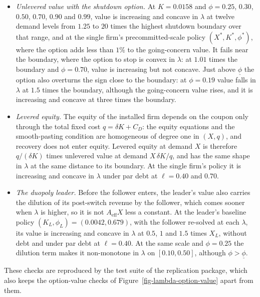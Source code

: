 \documentclass[
  11pt,
  letterpaper,
]{scrartcl}
\providecommand{\tightlist}{%
  \setlength{\itemsep}{0pt}\setlength{\parskip}{0pt}}
\begin{document}
\begin{itemize}
\tightlist
\item
  \emph{Unlevered value with the shutdown option.} At \(K = 0.0158\) and
  \(\phi = 0.25\), \(0.30\), \(0.50\), \(0.70\), \(0.90\) and \(0.99\),
  value is increasing and concave in \(\lambda\) at twelve demand levels
  from \(1.25\) to \(20\) times the highest shutdown boundary over that
  range, and at the single firm's precommitted-scale policy
  \((X^*, K^*, \phi^*)\), where the option adds less than \(1\%\) to the
  going-concern value. It fails near the boundary, where the option to
  stop is convex in \(\lambda\): at \(1.01\) times the boundary and
  \(\phi = 0.70\), value is increasing but not concave. Just above
  \(\underline{\phi}\) the option also overturns the sign close to the
  boundary: at \(\phi = 0.19\) value falls in \(\lambda\) at \(1.5\)
  times the boundary, although the going-concern value rises, and it is
  increasing and concave at three times the boundary.
\item
  \emph{Levered equity.} The equity of the installed firm depends on the
  coupon only through the total fixed cost \(q = \delta K + C_D\): the
  equity equations and the smooth-pasting condition are homogeneous of
  degree one in \((X, q)\), and recovery does not enter equity. Levered
  equity at demand \(X\) is therefore \(q/(\delta K)\) times unlevered
  value at demand \(X\,\delta K/q\), and has the same shape in
  \(\lambda\) at the same distance to its boundary. At the single firm's
  policy it is increasing and concave in \(\lambda\) under par debt at
  \(\ell = 0.40\) and \(0.70\).
\item
  \emph{The duopoly leader.} Before the follower enters, the leader's
  value also carries the dilution of its post-switch revenue by the
  follower, which comes sooner when \(\lambda\) is higher, so it is not
  \(A_{\text{eff}} X\) less a constant. At the leader's baseline policy
  \((K_L, \phi_L) = (0.0042, 0.679)\), with the follower re-solved at
  each \(\lambda\), its value is increasing and concave in \(\lambda\)
  at \(0.5\), \(1\) and \(1.5\) times \(X_L\), without debt and under
  par debt at \(\ell = 0.40\). At the same scale and \(\phi = 0.25\) the
  dilution term makes it non-monotone in \(\lambda\) on
  \([0.10, 0.50]\), although \(\phi > \underline{\phi}\).
\end{itemize}

These checks are reproduced by the test suite of the replication
package, which also keeps the option-value checks of
Figure~\ref{fig-lambda-option-value} apart from them.
\end{document}
